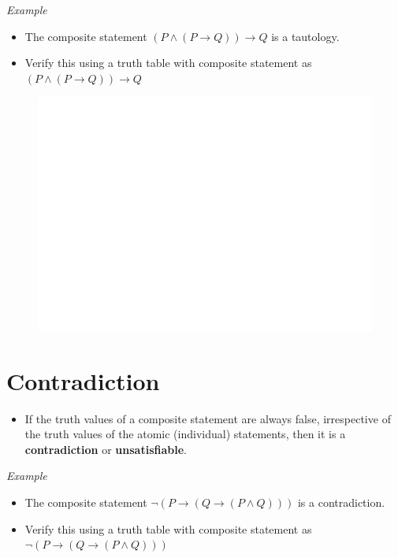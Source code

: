 \documentclass[]{book}
\providecommand{\tightlist}{%
  \setlength{\itemsep}{0pt}\setlength{\parskip}{0pt}}
\begin{document}
\emph{Example}

\begin{itemize}
\tightlist
\item
  The composite statement \((P\land (P \rightarrow Q)) \rightarrow Q\) is a tautology.
\item
  Verify this using a truth table with composite statement as \((P\land (P \rightarrow Q)) \rightarrow Q\)
\end{itemize}

\begin{figure}

{\centering \includegraphics[width=1\linewidth]{figure/boxC35-1} 

}

\end{figure}

\hypertarget{contradiction}{%
\section{Contradiction}\label{contradiction}}

\begin{itemize}
\tightlist
\item
  If the truth values of a composite statement are always false, irrespective of the truth values of the atomic (individual) statements, then it is a \textbf{contradiction} or \textbf{unsatisfiable}.
\end{itemize}

\emph{Example}

\begin{itemize}
\tightlist
\item
  The composite statement \(\lnot(P\rightarrow(Q\rightarrow(P\land Q)))\) is a contradiction.
\item
  Verify this using a truth table with composite statement as \(\lnot(P\rightarrow(Q\rightarrow(P\land Q)))\)
\end{itemize}
\end{document}

